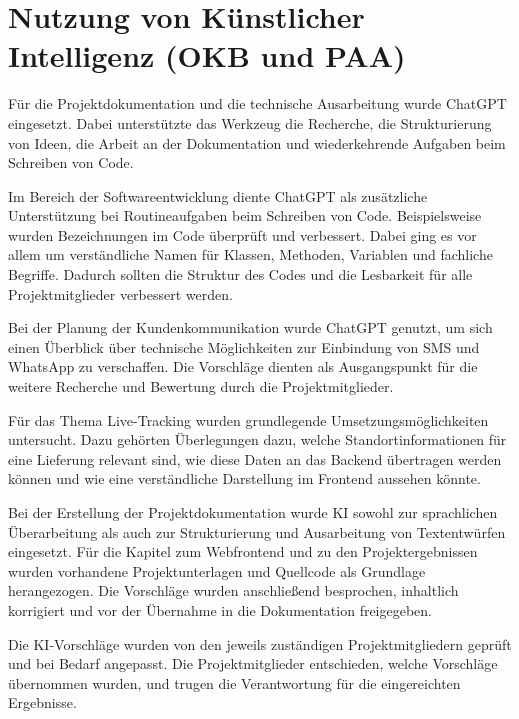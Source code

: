 \section{Nutzung von Künstlicher Intelligenz (OKB und PAA)}

Für die Projektdokumentation und die technische Ausarbeitung wurde ChatGPT eingesetzt. Dabei unterstützte das Werkzeug die Recherche, die Strukturierung von Ideen, die Arbeit an der Dokumentation und wiederkehrende Aufgaben beim Schreiben von Code.

Im Bereich der Softwareentwicklung diente ChatGPT als zusätzliche Unterstützung bei Routineaufgaben beim Schreiben von Code. Beispielsweise wurden Bezeichnungen im Code überprüft und verbessert. Dabei ging es vor allem um verständliche Namen für Klassen, Methoden, Variablen und fachliche Begriffe. Dadurch sollten die Struktur des Codes und die Lesbarkeit für alle Projektmitglieder verbessert werden.

Bei der Planung der Kundenkommunikation wurde ChatGPT genutzt, um sich einen Überblick über technische Möglichkeiten zur Einbindung von SMS und WhatsApp zu verschaffen. Die Vorschläge dienten als Ausgangspunkt für die weitere Recherche und Bewertung durch die Projektmitglieder.

Für das Thema Live-Tracking wurden grundlegende Umsetzungsmöglichkeiten untersucht. Dazu gehörten Überlegungen dazu, welche Standortinformationen für eine Lieferung relevant sind, wie diese Daten an das Backend übertragen werden können und wie eine verständliche Darstellung im Frontend aussehen könnte.

Bei der Erstellung der Projektdokumentation wurde KI sowohl zur sprachlichen Überarbeitung als auch zur Strukturierung und Ausarbeitung von Textentwürfen eingesetzt. Für die Kapitel zum Webfrontend und zu den Projektergebnissen wurden vorhandene Projektunterlagen und Quellcode als Grundlage herangezogen. Die Vorschläge wurden anschließend besprochen, inhaltlich korrigiert und vor der Übernahme in die Dokumentation freigegeben.

Die KI-Vorschläge wurden von den jeweils zuständigen Projektmitgliedern geprüft und bei Bedarf angepasst. Die Projektmitglieder entschieden, welche Vorschläge übernommen wurden, und trugen die Verantwortung für die eingereichten Ergebnisse.
